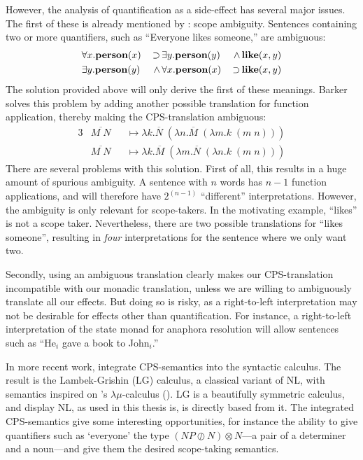However, the analysis of quantification as a side-effect has several
major issues. The first of these is already mentioned by
\citet{barker2004}: scope ambiguity. Sentences containing two or
more quantifiers, such as ``Everyone likes someone,'' are ambiguous:
\begin{alignat*}{3}
  &\forall x.\mathbf{person}(x) \,&\supset \,&\exists y.\mathbf{person}(y) \,&\wedge  \,&\mathbf{like}(x,y)\\
  &\exists y.\mathbf{person}(y) \,&\wedge  \,&\forall x.\mathbf{person}(x) \,&\supset \,&\mathbf{like}(x,y)
\end{alignat*}
The solution provided above will only derive the first of these
meanings. Barker solves this problem by adding another possible
translation for function application, thereby making the
CPS-translation ambiguous:
\begin{alignat*}{3}
  &\overline{M\;N} &&\mapsto \lambda k. \overline{N}\;(\lambda
  n.\overline{M}\;(\lambda m.k\;(m\;n)))\\
  &\overline{M\;N} &&\mapsto \lambda k. \overline{M}\;(\lambda
  m.\overline{N}\;(\lambda n.k\;(m\;n)))
\end{alignat*}
There are several problems with this solution. First of all, this
results in a huge amount of spurious ambiguity. A sentence with $n$
words has $n-1$ function applications, and will therefore have
$2^{(n-1)}$ ``different'' interpretations. However, the ambiguity is
only relevant for scope-takers. In the motivating example, ``likes''
is not a scope taker. Nevertheless, there are two possible
translations for ``likes someone'', resulting in \emph{four}
interpretations for the sentence where we only want two.

Secondly, using an ambiguous translation clearly makes our
CPS-translation incompatible with our monadic translation, unless we
are willing to ambiguously translate all our effects. But doing so is
risky, as a right-to-left interpretation may not be desirable for
effects other than quantification. For instance, a right-to-left
interpretation of the state monad for anaphora resolution will allow
sentences such as ``He$_i$ gave a book to John$_i$.''

\vspace*{1\baselineskip}

In more recent work, \citet{moortgat2012} integrate CPS-semantics into
the syntactic calculus. The result is the Lambek-Grishin (LG)
calculus, a classical variant of NL, with semantics inspired on
\citeauthor{parigot1992}'s $\lambda\mu$-calculus
(\citeyear{parigot1992}). LG is a beautifully symmetric calculus, and
display NL, as used in this thesis is, is directly based from it. The
integrated CPS-semantics give some interesting opportunities, for
instance the ability to give quantifiers such as `everyone' the type
$(NP\oslash N)\otimes N$---a pair of a determiner and a noun---and
give them the desired scope-taking semantics.

